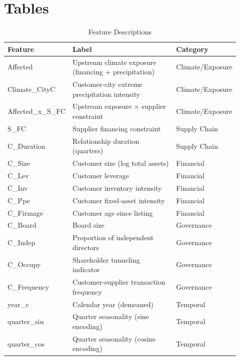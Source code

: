 \documentclass[12pt]{article}
\begin{document}
\newpage
\section*{Tables}

\begin{table}[H]
\centering
\caption{Feature Descriptions}\label{tab:features}
\begin{threeparttable}
\scriptsize
\begin{tabular}{@{}p{0.23\linewidth}p{0.50\linewidth}p{0.19\linewidth}@{}}
\toprule
Feature & Label & Category \\
\midrule
Affected & Upstream climate exposure (financing + precipitation) & Climate/Exposure \\
Climate\_CityC & Customer-city extreme precipitation intensity & Climate/Exposure \\
Affected\_x\_S\_FC & Upstream exposure $\times$ supplier constraint & Climate/Exposure \\
S\_FC & Supplier financing constraint & Supply Chain \\
C\_Duration & Relationship duration (quarters) & Supply Chain \\
C\_Size & Customer size (log total assets) & Financial \\
C\_Lev & Customer leverage & Financial \\
C\_Inv & Customer inventory intensity & Financial \\
C\_Ppe & Customer fixed-asset intensity & Financial \\
C\_Firmage & Customer age since listing & Financial \\
C\_Board & Board size & Governance \\
C\_Indep & Proportion of independent directors & Governance \\
C\_Occupy & Shareholder tunneling indicator & Governance \\
C\_Frequency & Customer-supplier transaction frequency & Governance \\
year\_c & Calendar year (demeaned) & Temporal \\
quarter\_sin & Quarter seasonality (sine encoding) & Temporal \\
quarter\_cos & Quarter seasonality (cosine encoding) & Temporal \\
\bottomrule
\end{tabular}
\begin{tablenotes}

\end{tablenotes}
\end{threeparttable}
\end{table}
\end{document}
